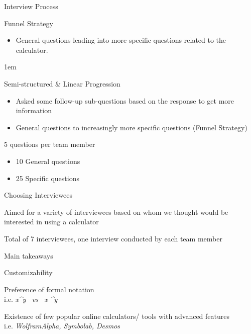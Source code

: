 \documentclass[12pt]{beamer}
\begin{document}
\begin{frame}{Interview Process}
 \begin{fullpageitemize}
  \item Funnel Strategy 
    \begin{itemize}
        \item General questions leading into more specific questions related to the calculator. \pause
    \end{itemize}
    \itemsep1em
  \item Semi-structured \& Linear Progression 
    \begin{itemize}
        \item Asked some follow-up sub-questions based on the response to get more information
        \item General questions to increasingly more specific questions (Funnel Strategy) \pause
    \end{itemize}
  \item 5 questions per team member
  \begin{itemize}
        \item 10 General questions
        \item 25 Specific questions
    \end{itemize}
 \end{fullpageitemize}
\end{frame}

\begin{frame}{Choosing Interviewees}
 \begin{fullpageitemize}
    \item Aimed for a variety of interviewees based on whom we thought would be interested in using a calculator \pause
    \item Total of 7 interviewees, one interview conducted by each team member
 \end{fullpageitemize}
\end{frame}

\begin{frame}{Main takeaways}
 \begin{fullpageitemize}
    \item Customizability \pause
    \item Preference of formal notation \\ i.e. \textit{x^y \ vs \ x \textasciicircum y\\} \pause
    \item Existence of few popular online calculators/ tools with advanced features \\ i.e. \textit{WolframAlpha, Symbolab, Desmos\\}
 \end{fullpageitemize}
\end{frame}
\end{document}
